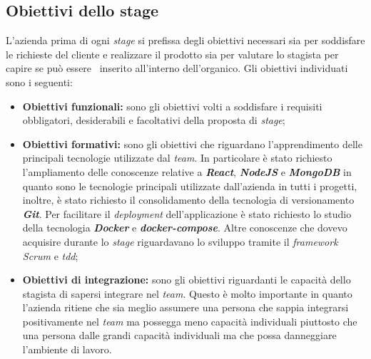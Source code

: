 \subsection{Obiettivi dello stage}
L'azienda prima di ogni \emph{stage} si prefissa degli obiettivi necessari sia per soddisfare le richieste del cliente e realizzare il prodotto sia per valutare lo stagista per capire se può essere \
inserito all'interno dell'organico. Gli obiettivi individuati sono i seguenti:
\begin{itemize}
  \item \textbf{Obiettivi funzionali:} sono gli obiettivi volti a soddisfare i requisiti obbligatori, desiderabili e facoltativi della proposta di \emph{stage};
  \item \textbf{Obiettivi formativi:} sono gli obiettivi che riguardano l'apprendimento delle principali tecnologie utilizzate dal \emph{team}. In particolare è stato richiesto l'ampliamento delle conoscenze relative a \emph{\textbf{React}}, \emph{\textbf{NodeJS}} e \emph{\textbf{MongoDB}} in quanto sono le tecnologie principali utilizzate dall'azienda in tutti i progetti, inoltre, è stato richiesto il consolidamento della tecnologia di versionamento \emph{\textbf{Git}}. Per facilitare il \emph{deployment} dell'applicazione è stato richiesto lo studio della tecnologia \emph{\textbf{Docker}} e \emph{\textbf{docker-compose}}. Altre conoscenze che dovevo acquisire durante lo \emph{stage} riguardavano lo sviluppo tramite il \emph{framework Scrum} e \emph{\acrshort{tdd}};
  \item \textbf{Obiettivi di integrazione:} sono gli obiettivi riguardanti le capacità dello stagista di sapersi integrare nel \emph{team}. Questo è molto importante in quanto l'azienda ritiene che sia meglio assumere una persona che sappia integrarsi positivamente nel \emph{team} ma possegga meno capacità individuali piuttosto che una persona dalle grandi capacità individuali ma che possa danneggiare l'ambiente di lavoro.
\end{itemize}

